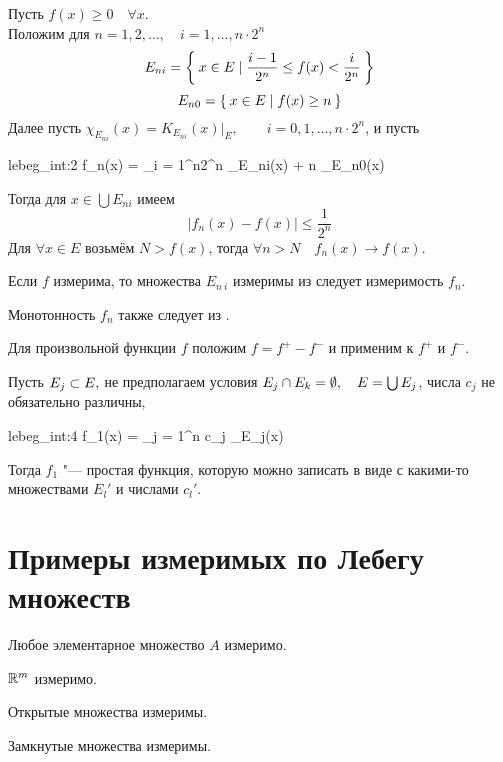 \begin{eproof}
	\item Пусть $ f(x) \ge 0 \quad \forall x $. \\
		Положим для $ n = 1, 2, \dots, \quad i = 1, \dots, n \cdot 2^n $
		$$ E_{ni} = \Set{x \in E \mid \frac{i - 1}{2^n} \le f(x) < \frac i{2^n}} $$
		$$ E_{n0} = \Set{x \in E \mid f(x) \ge n} $$
		Далее пусть $ \chi_{E_{ni}}(x) = K_{E_{ni}}(x) \big|_E, \qquad i = 0, 1, \dots, n \cdot 2^n $, и пусть
		\begin{equ}{lebeg_int:2}
			f_n(x) = \sum_{i = 1}^{n2^n}  \chi_{E_{ni}}(x) + n \chi_{E_{n0}}(x)
		\end{equ}
		Тогда для $ x \in \bigcup E_{ni} $ имеем
		$$ |f_n(x) - f(x)| \le \frac1{2^n} $$
		Для $ \forall x \in E $ возьмём $ N > f(x) $, тогда $ \forall n > N \quad f_n(x) \to f(x) $.

	\item Если $ f $ измерима, то множества $ E_{n~i} $ измеримы из  следует измеримость $ f_n $.

	\item Монотонность $ f_n $ также следует из .

	\item Для произвольной функции $ f $ положим $ f = f^+ - f^- $ и  применим к $ f^+ $ и $ f^- $.
\end{eproof}

\begin{remark}
	Пусть $ E_j \subset E, $ не предполагаем условия $ E_j \cap E_k = \emptyset, \quad E = \bigcup E_j $, числа $ c_j $ не обязательно различны,
	\begin{equ}{lebeg_int:4}
		f_1(x) = \sum_{j = 1}^n c_j \chi_{E_j}(x)
	\end{equ}

	Тогда $ f_1 $ "--- простая функция, которую можно записать в виде  с какими-то множествами $ E_l' $ и числами $ c_l' $.
\end{remark}

\section{Примеры измеримых по Лебегу множеств}

\begin{exmpls}
	\item Любое элементарное множество $ A $ измеримо.
	\item $ \mathbb{R}^m $ измеримо.
	\item Открытые множества измеримы.
	\item Замкнутые множества измеримы.
\end{exmpls}

